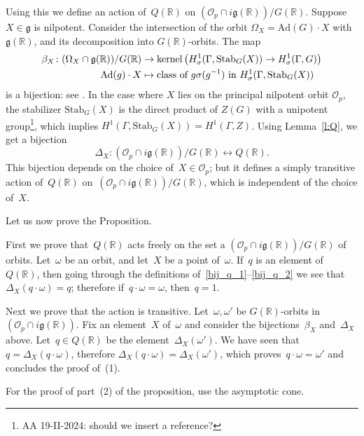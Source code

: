 \documentclass[10pt,leqno]{article}
\newcommand{\kernel}{\mathrm{kernel}}
\renewcommand{\O}{\mathcal O}
\newcommand{\R}{\mathbb R}
\newcommand{\g}{\mathfrak g}
\newcommand{\Op}{\O_p}
\begin{document}
Using this we define an action of~$Q(\R)$ on $(\Op \cap i\g(\R))/G(\R)$. Suppose~$X \in \g$ is nilpotent. Consider the intersection of the orbit $\Omega_X=\mathrm{Ad}(G) \cdot X$ with $\g(\R)$, and its decomposition into $G(\R)$-orbits. The map 
\begin{align} \label{bij_q_2}\beta_X\colon (\Omega_{X} \cap \g(\R))/G(\R) & \to \kernel\left(H^1_\sigma(\Gamma,\mathrm{Stab}_G(X))\rightarrow H^1_\sigma(\Gamma,G)\right) \\ \mathrm{Ad}(g) \cdot X & \mapsto \text{class of $ g\sigma(g^{-1})$ in $H^1_\sigma(\Gamma,\mathrm{Stab}_G(X))$} \nonumber \end{align} 
is a bijection: see \cite[Lemma 5.2]{galois}. 
In the case where $X$ lies on the principal nilpotent orbit $\Op$, the stabilizer $\mathrm{Stab}_G(X)$ is the direct product of $Z(G)$ with a unipotent group\footnote{AA 19-II-2024: should we insert a reference?}, which implies $H^1(\Gamma, \mathrm{Stab}_G(X)) =H^1(\Gamma,Z)$. Using Lemma~\ref{l:Q}, we get a bijection 
\[\Delta_X\colon (\Op \cap i\g(\R))/G(\R) \leftrightarrow Q(\R).\]
This bijection depends  on the choice of~$X \in \Op$; but it defines a simply transitive action of~$Q(\R)$ on~$(\Op \cap i\g(\R))/G(\R)$, which is independent of the choice of~$X$.

Let us now prove the Proposition. 

First we prove that~$Q(\R)$ acts freely on the set a  $(\Op \cap i\g(\R))/G(\R)$ of orbits. Let~$\omega$ be an orbit, and let~$X$ be a point of~$\omega$. If~$q$ is an element of~$Q(\R)$, then going through the definitions of~\eqref{bij_q_1}--\eqref{bij_q_2} we see that~$\Delta_X(q \cdot \omega) = q$; therefore if~$q\cdot \omega=\omega$, then~$q=1$.

Next we prove that the action is transitive. Let~$\omega, \omega'$ be $G(\R)$-orbits in  $(\Op \cap i\g(\R))$. Fix an element~$X$ of~$\omega$ and consider the bijections~$\beta_X$ and~$\Delta_X$ above. Let~$q \in Q(\R)$ be the element~$\Delta_X(\omega')$. We have seen that $q = \Delta_X(q \cdot \omega)$, therefore \mbox{$\Delta_X(q \cdot \omega)=\Delta_X(\omega')$}, which proves~$q \cdot \omega = \omega'$ and concludes the proof of~(1). 

For the proof of part~(2) of the proposition, use the asymptotic cone.
 
\end{document}
